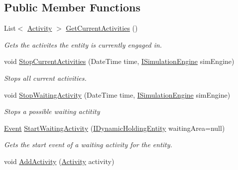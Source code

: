\subsection*{Public Member Functions}
\begin{DoxyCompactItemize}
\item 
List$<$ \hyperlink{class_simulation_core_1_1_h_c_c_m_elements_1_1_activity}{Activity} $>$ \hyperlink{interface_simulation_core_1_1_h_c_c_m_elements_1_1_i_active_entity_ae4ac328daf6d27636694516bb16fe62e}{Get\+Current\+Activities} ()
\begin{DoxyCompactList}\small\item\em Gets the activites the entity is currently engaged in. \end{DoxyCompactList}\item 
void \hyperlink{interface_simulation_core_1_1_h_c_c_m_elements_1_1_i_active_entity_a4215fd6cba7662358cd97614d881efa6}{Stop\+Current\+Activities} (Date\+Time time, \hyperlink{interface_simulation_core_1_1_simulation_classes_1_1_i_simulation_engine}{I\+Simulation\+Engine} sim\+Engine)
\begin{DoxyCompactList}\small\item\em Stops all current activities. \end{DoxyCompactList}\item 
void \hyperlink{interface_simulation_core_1_1_h_c_c_m_elements_1_1_i_active_entity_a03a668233488f9a8c21ba7c537fce025}{Stop\+Waiting\+Activity} (Date\+Time time, \hyperlink{interface_simulation_core_1_1_simulation_classes_1_1_i_simulation_engine}{I\+Simulation\+Engine} sim\+Engine)
\begin{DoxyCompactList}\small\item\em Stops a possible waiting actitity \end{DoxyCompactList}\item 
\hyperlink{class_simulation_core_1_1_h_c_c_m_elements_1_1_event}{Event} \hyperlink{interface_simulation_core_1_1_h_c_c_m_elements_1_1_i_active_entity_a5ca8eb5f9de0713e7b7030682f2b6347}{Start\+Waiting\+Activity} (\hyperlink{interface_simulation_core_1_1_h_c_c_m_elements_1_1_i_dynamic_holding_entity}{I\+Dynamic\+Holding\+Entity} waiting\+Area=null)
\begin{DoxyCompactList}\small\item\em Gets the start event of a waiting activity for the entity. \end{DoxyCompactList}\item 
void \hyperlink{interface_simulation_core_1_1_h_c_c_m_elements_1_1_i_active_entity_af2f122a2530a9111b4e5da919d4b44d8}{Add\+Activity} (\hyperlink{class_simulation_core_1_1_h_c_c_m_elements_1_1_activity}{Activity} activity)

\end{DoxyCompactItemize}
